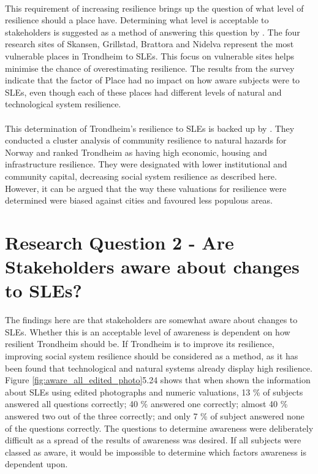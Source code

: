 \paragraph{}
This requirement of increasing resilience brings up the question of what level of resilience should a place have. Determining what level is acceptable to stakeholders is suggested as a method of answering this question by \cite{gerkensmeier_governing_2018}. The four research sites of Skansen, Grillstad, Brattora and Nidelva represent the most vulnerable places in Trondheim to SLEs. This focus on vulnerable sites helps minimise the chance of overestimating resilience. The results from the survey indicate that the factor of Place had no impact on how aware subjects were to SLEs, even though each of these places had different levels of natural and technological system resilience. 
\paragraph{}
This determination of Trondheim's resilience to SLEs is backed up by \cite{opach_seeking_2020}. They conducted a cluster analysis of community resilience to natural hazards for Norway and ranked Trondheim as having high economic, housing and infrastructure resilience. They were designated with lower institutional and community capital, decreasing social system resilience as described here. However, it can be argued that the way these valuations for resilience were determined were biased against cities and favoured less populous areas.



\section{Research Question 2 - Are Stakeholders aware about changes to SLEs?} \label{RQ2 - findings}

The findings here are that stakeholders are somewhat aware about changes to SLEs. Whether this is an acceptable level of awareness is dependent on how resilient Trondheim should be. If Trondheim is to improve its resilience, improving social system resilience should be considered as a method, as it has been found that technological and natural systems already display high resilience. Figure \ref{fig:aware_all_edited_photo}5.24 shows that when shown the information about SLEs using edited photographs and numeric valuations, 13 \% of subjects answered all questions correctly; 40 \% answered one correctly; almost 40 \% answered two out of the three correctly; and only 7 \% of subject answered none of the questions correctly. The questions to determine awareness were deliberately difficult as a spread of the results of awareness was desired. If all subjects were classed as aware, it would be impossible to determine which factors awareness is dependent upon. 
